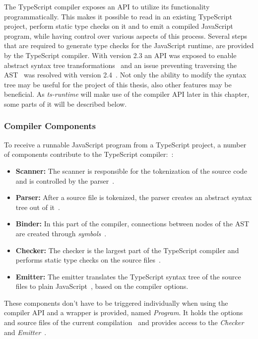 The TypeScript compiler exposes an API to utilize its functionality programmatically. This makes it possible to read in an existing TypeScript project, perform static type checks on it and to emit a compiled JavaScript program, while having control over various aspects of this process. Several steps that are required to generate type checks for the JavaScript runtime, are provided by the TypeScript compiler. With version 2.3 an API was exposed to enable abstract syntax tree transformations~\cite{TypeScriptPullRequest:Transformation} and an issue preventing traversing the AST~\cite{TypeScriptIssue:Visitors} was resolved with version 2.4~\cite{TypeScriptPullRequest:Visitors}. Not only the ability to modify the syntax tree may be useful for the project of this thesis, also other features may be beneficial. As \emph{ts-runtime} will make use of the compiler API later in this chapter, some parts of it will be described below.

\subsubsection{Compiler Components}

To receive a runnable JavaScript program from a TypeScript project, a number of components contribute to the TypeScript compiler:~\cite[p.~251]{TypeScriptBook:Syed:2017}:
\begin{itemize}
  \item \textbf{Scanner:} The scanner is responsible for the tokenization of the source code and is controlled by the parser~\cite[p.~260]{TypeScriptBook:Syed:2017}.
  \item \textbf{Parser:} After a source file is tokenized, the parser creates an abstract syntax tree out of it~\cite[p.~263]{TypeScriptBook:Syed:2017}.
  \item \textbf{Binder:} In this part of the compiler, connections between nodes of the AST are created through \emph{symbols}~\cite[p.~267]{TypeScriptBook:Syed:2017}.
  \item \textbf{Checker:} The checker is the largest part of the TypeScript compiler and performs static type checks on the source files~\cite[p.~282]{TypeScriptBook:Syed:2017}.
  \item \textbf{Emitter:} The emitter translates the TypeScript syntax tree of the source files to plain JavaScript~\cite[p.~286]{TypeScriptBook:Syed:2017}, based on the compiler options.
\end{itemize}
These components don't have to be triggered individually when using the compiler API and a wrapper is provided, named \emph{Program}. It holds the options and source files of the current compilation~\cite[p.~254]{TypeScriptBook:Syed:2017} and provides access to the \emph{Checker}~\cite[p.~282]{TypeScriptBook:Syed:2017} and \emph{Emitter}~\cite[p.~286]{TypeScriptBook:Syed:2017}.

